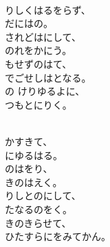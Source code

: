 \documentclass[10pt,b5j]{tarticle} %
\begin{document}
\vspace{1.5em} %
\newcommand{\linespace}{0.5em} %
\newcommand{\blocksize}{0.5\hsize} %
\newcommand{\itemmargin}{6em} %
\begin{enumerate} %
    \setlength{\itemindent}{\itemmargin} %
    \begin{minipage}[c]{\blocksize}
    
        \vspace{\linespace}
        \item~\\
        りしくはるをらず、\\
        だにはの。\\
        されどはにして、\\
        のれをかにう。\\
        もせずのはて、\\
        でごせしはとなる。\\
        の けりゆるよに、\\
        つもとにりく。
        
        \vspace{\linespace}
        \item~\\
        かすきて、\\
        にゆるはる。\\
        のはをり、\\
        きのはえく。\\
        りしとのにして、\\
        たなるのをく。\\
        きのきらせて、\\
        ひたすらにをみてかん。
    
    \end{minipage}
\end{enumerate} %
\end{document}
